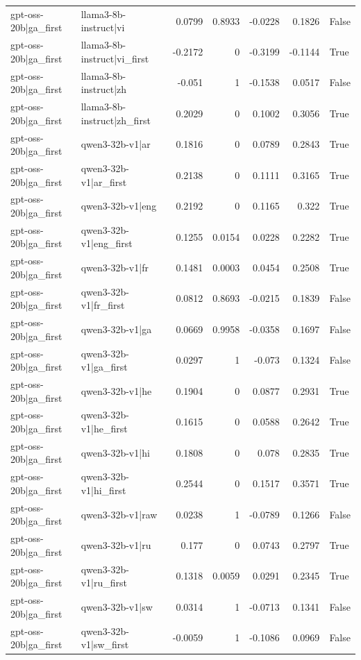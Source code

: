 \begin{table}
\begin{tabular}{l l r r r r l}
gpt-oss-20b|ga_first & llama3-8b-instruct|vi & 0.0799 & 0.8933 & -0.0228 & 0.1826 & False \\
gpt-oss-20b|ga_first & llama3-8b-instruct|vi_first & -0.2172 & 0 & -0.3199 & -0.1144 & True \\
gpt-oss-20b|ga_first & llama3-8b-instruct|zh & -0.051 & 1 & -0.1538 & 0.0517 & False \\
gpt-oss-20b|ga_first & llama3-8b-instruct|zh_first & 0.2029 & 0 & 0.1002 & 0.3056 & True \\
gpt-oss-20b|ga_first & qwen3-32b-v1|ar & 0.1816 & 0 & 0.0789 & 0.2843 & True \\
gpt-oss-20b|ga_first & qwen3-32b-v1|ar_first & 0.2138 & 0 & 0.1111 & 0.3165 & True \\
gpt-oss-20b|ga_first & qwen3-32b-v1|eng & 0.2192 & 0 & 0.1165 & 0.322 & True \\
gpt-oss-20b|ga_first & qwen3-32b-v1|eng_first & 0.1255 & 0.0154 & 0.0228 & 0.2282 & True \\
gpt-oss-20b|ga_first & qwen3-32b-v1|fr & 0.1481 & 0.0003 & 0.0454 & 0.2508 & True \\
gpt-oss-20b|ga_first & qwen3-32b-v1|fr_first & 0.0812 & 0.8693 & -0.0215 & 0.1839 & False \\
gpt-oss-20b|ga_first & qwen3-32b-v1|ga & 0.0669 & 0.9958 & -0.0358 & 0.1697 & False \\
gpt-oss-20b|ga_first & qwen3-32b-v1|ga_first & 0.0297 & 1 & -0.073 & 0.1324 & False \\
gpt-oss-20b|ga_first & qwen3-32b-v1|he & 0.1904 & 0 & 0.0877 & 0.2931 & True \\
gpt-oss-20b|ga_first & qwen3-32b-v1|he_first & 0.1615 & 0 & 0.0588 & 0.2642 & True \\
gpt-oss-20b|ga_first & qwen3-32b-v1|hi & 0.1808 & 0 & 0.078 & 0.2835 & True \\
gpt-oss-20b|ga_first & qwen3-32b-v1|hi_first & 0.2544 & 0 & 0.1517 & 0.3571 & True \\
gpt-oss-20b|ga_first & qwen3-32b-v1|raw & 0.0238 & 1 & -0.0789 & 0.1266 & False \\
gpt-oss-20b|ga_first & qwen3-32b-v1|ru & 0.177 & 0 & 0.0743 & 0.2797 & True \\
gpt-oss-20b|ga_first & qwen3-32b-v1|ru_first & 0.1318 & 0.0059 & 0.0291 & 0.2345 & True \\
gpt-oss-20b|ga_first & qwen3-32b-v1|sw & 0.0314 & 1 & -0.0713 & 0.1341 & False \\
gpt-oss-20b|ga_first & qwen3-32b-v1|sw_first & -0.0059 & 1 & -0.1086 & 0.0969 & False \\

\end{tabular}
\end{table}
